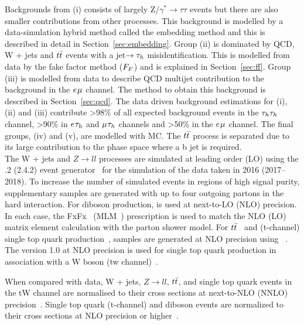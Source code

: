 Backgrounds from (i) consists of largely Z/$\gamma^* \rightarrow \tau\tau$ events but there are also smaller contributions from other processes. 
This background is modelled by a data-simulation hybrid method called the embedding method and this is described in detail in Section~\ref{sec:embedding}.
Group (ii) is dominated by QCD, W + jets and $t\bar{t}$ events with a jet$\rightarrow \tau_{h}$ misidentification.
This is modelled from data by the fake factor method ($F_{F}$) and is explained in Section~\ref{sec:ff}.
Group (iii) is modelled from data to describe QCD multijet contribution to the background in the $e_{}\mu_{}$ channel.
The method to obtain this background is described in Section~\ref{sec:qcd}.
The data driven background estimations for (i), (ii) and (iii) contribute >98\% of all expected background events in the $\tau_{h}\tau_{h}$ channel, >90\% in $e_{}\tau_{h}$ and $\mu_{}\tau_{h}$ channels and >50\% in the $e_{}\mu_{}$ channel.
The final groups, (iv) and (v), are modelled with MC.
The $t\bar{t}$ process is separated due to its large contribution to the phase space where a b jet is required. \\

The W + jets and $Z\rightarrow ll$ processes are simulated at leading order (LO) using the .2 (2.4.2) event generator~\cite{Alwall:2011uj,Alwall:2014hca} for the simulation of the data taken in 2016 (2017--2018). 
To increase the number of simulated events in regions of high signal purity, supplementary samples are generated with up to four outgoing partons in the hard interaction. 
For diboson production, \MGvATNLO is used at next-to-LO (NLO) precision. 
In each case, the FxFx~\cite{Frederix:2012ps} (MLM~\cite{Alwall:2007fs})  prescription is used to match the NLO (LO) matrix element calculation with the parton shower model. 
For $t\bar{t}$~\cite{Alioli:2011as} and (t-channel) single top quark production~\cite{Frederix:2012dh}, samples are generated at NLO precision using ~\cite{Nason:2004rx,Frixione:2007vw,Alioli:2010xd,Jezo2015aia}. 
The \POWHEG version 1.0 at NLO precision is used for single top quark production in association with a W boson (tw channel)~\cite{Re:2010bp}. 

When compared with data, W + jets, $Z\rightarrow ll$, $t\bar{t}$, and single top quark events in the tW channel are normalised to their cross sections at next-to-NLO (NNLO) precision~\cite{Melnikov:2006kv,Czakon:2011xx,Kidonakis:2013zqa}. 
Single top quark (t-channel) and diboson events are normalized to their cross sections at NLO precision or higher~\cite{Kidonakis:2013zqa,Campbell:2011bn,Gehrmann:2014fva}.



